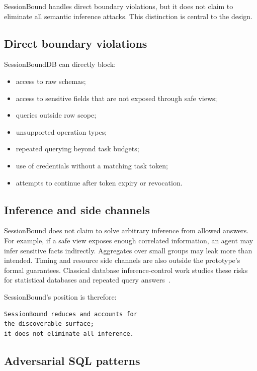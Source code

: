 \documentclass[journal]{IEEEtran}
\providecommand{\tightlist}{%
  \setlength{\itemsep}{0pt}\setlength{\parskip}{0pt}}
\begin{document}
SessionBound handles direct boundary violations, but it does not claim
to eliminate all semantic inference attacks. This distinction is central
to the design.

\hypertarget{direct-boundary-violations}{%
\subsection{Direct boundary
violations}\label{direct-boundary-violations}}

SessionBoundDB can directly block:

\begin{itemize}
\tightlist
\item
  access to raw schemas;
\item
  access to sensitive fields that are not exposed through safe views;
\item
  queries outside row scope;
\item
  unsupported operation types;
\item
  repeated querying beyond task budgets;
\item
  use of credentials without a matching task token;
\item
  attempts to continue after token expiry or revocation.
\end{itemize}

\hypertarget{inference-and-side-channels}{%
\subsection{Inference and side
channels}\label{inference-and-side-channels}}

SessionBound does not claim to solve arbitrary inference from allowed
answers. For example, if a safe view exposes enough correlated
information, an agent may infer sensitive facts indirectly. Aggregates
over small groups may leak more than intended. Timing and resource side
channels are also outside the prototype's formal guarantees.
Classical database inference-control work studies these risks for
statistical databases and repeated query answers~\cite{adam1989securitycontrol}.

SessionBound's position is therefore:

\begin{verbatim}
SessionBound reduces and accounts for
the discoverable surface;
it does not eliminate all inference.
\end{verbatim}

\hypertarget{adversarial-sql-patterns}{%
\subsection{Adversarial SQL
patterns}\label{adversarial-sql-patterns}}
\end{document}
